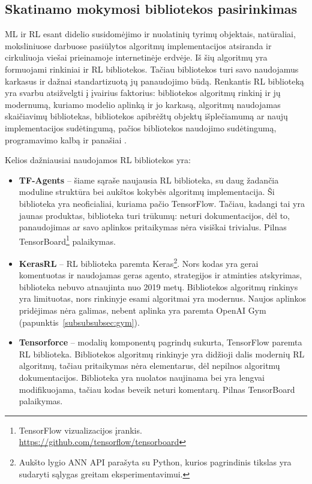 \documentclass{VUMIFPSbakalaurinis}
\begin{document}
\subsection{Skatinamo mokymosi bibliotekos pasirinkimas}
{
	ML ir RL esant didelio susidomėjimo ir nuolatinių tyrimų objektais, natūraliai, moksliniuose darbuose pasiūlytos algoritmų implementacijos atsiranda ir cirkuliuoja viešai prieinamoje internetinėje erdvėje. Iš šių algoritmų yra formuojami rinkiniai ir RL bibliotekos. Tačiau bibliotekos turi savo naudojamus karkasus ir dažnai standartizuotą jų panaudojimo būdą. Renkantis RL biblioteką yra svarbu atsižvelgti į įvairius faktorius:  bibliotekos algoritmų rinkinį ir jų modernumą, kuriamo modelio aplinką ir jo karkasą, algoritmų naudojamas skaičiavimų bibliotekas, bibliotekos apibrėžtų objektų išplečiamumą ar naujų implementacijos sudėtingumą, pačios bibliotekos naudojimo sudėtingumą, programavimo kalbą ir panašiai \cite{simonini_2019}.\par
	
	Kelios dažniausiai naudojamos RL bibliotekos yra:
	\begin{itemize}
		\item \textbf{TF-Agents} \cite{TFAgents} -- šiame sąraše naujausia RL biblioteka, su daug žadančia moduline struktūra bei aukštos kokybės algoritmų implementacija. Ši biblioteka yra neoficialiai, kuriama pačio TensorFlow. Tačiau, kadangi tai yra jaunas produktas, biblioteka turi trūkumų: neturi dokumentacijos, dėl to, panaudojimas ar savo aplinkos pritaikymas nėra visiškai trivialus. Pilnas TensorBoard\footnote{TensorFlow vizualizacijos įrankis. \url{https://github.com/tensorflow/tensorboard}} palaikymas.
		
		\item \textbf{KerasRL} \cite{plappert2016kerasrl} -- RL biblioteka paremta Keras\footnote{Aukšto lygio ANN API parašyta su Python, kurios pagrindinis tikslas yra sudaryti sąlygas greitam eksperimentavimui.}. Nors kodas yra gerai komentuotas ir naudojamas geras agento, strategijos ir atminties atskyrimas, biblioteka nebuvo atnaujinta nuo 2019 metų. Bibliotekos algoritmų rinkinys yra limituotas, nors rinkinyje esami algoritmai yra modernus. Naujos aplinkos pridėjimas nėra galimas, nebent aplinka yra paremta OpenAI Gym (papunktis~\ref{subsubsubsec:gym}).
		
		\item \textbf{Tensorforce} \cite{tensorforce} -- modalių komponentų pagrindų sukurta, TensorFlow paremta RL biblioteka. Bibliotekos algoritmų rinkinyje yra didžioji dalis modernių RL algoritmų, tačiau pritaikymas nėra elementarus, dėl nepilnos algoritmų dokumentacijos. Biblioteka yra nuolatos naujinama bei yra lengvai modifikuojama, tačiau kodas beveik neturi komentarų. Pilnas TensorBoard palaikymas.
		

\end{itemize}}
\end{document}
